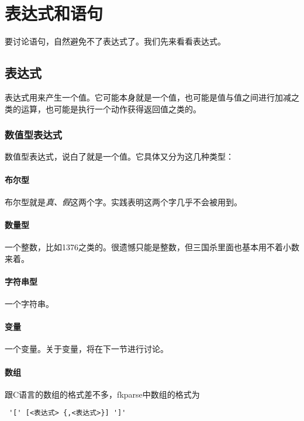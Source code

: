 \chapter{表达式和语句}

要讨论语句，自然避免不了表达式了。我们先来看看表达式。

\section{表达式}

表达式用来产生一个值。它可能本身就是一个值，也可能是值与值之间进行加减之类的运算，也可能是执行一个动作获得返回值之类的。

\subsection{数值型表达式}

数值型表达式，说白了就是一个值。它具体又分为这几种类型：

\subsubsection{布尔型}

布尔型就是\emph{真、假}这两个字。实践表明这两个字几乎不会被用到。

\subsubsection{数量型}

一个整数，比如1376之类的。很遗憾只能是整数，但三国杀里面也基本用不着小数来着。

\subsubsection{字符串型}

一个字符串。

\subsubsection{变量}

一个变量。关于变量，将在下一节进行讨论。

\subsubsection{数组}

跟C语言的数组的格式差不多，fkparse中数组的格式为

\begin{verbatim}
 '[' [<表达式> {,<表达式>}] ']'
\end{verbatim}

